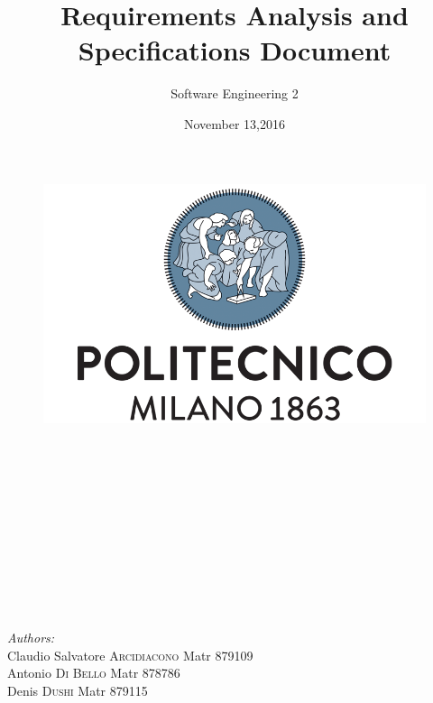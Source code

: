 \documentclass[a4paper]{article}
\title{Requirements Analysis and Specifications Document}
\author{Software Engineering 2}
\date{November 13,2016}
\begin{document}
\maketitle

\begin{figure}[h]
  \centering
  \includegraphics[width=300 pt]{resources/polimi.png}
  \label{fig:polimi}
\end{figure}

\emph{\\}
\emph{\\}
\emph{\\}
\emph{\\}
\emph{\\}
\emph{\\}
\emph{\\}
\emph{\\}
\emph{\\}
\emph{\\}

\begin{minipage}{0.7\textwidth}
\begin{flushleft} \large
\emph{Authors:}\\
Claudio Salvatore \textsc{Arcidiacono} Matr 879109\\
Antonio \emph{ }\emph{ }\emph{ }\emph{ }\emph{ }\emph{ }\emph{ }\emph{ }\emph{ }\emph{ }\emph{ }\emph{ }\textsc{Di Bello} \emph{ }\emph{ }\emph{ }\emph{ } Matr 878786\\
Denis  \emph{ }\emph{ }\emph{ }\emph{ }\emph{ }\emph{ }\emph{ }\emph{ }\emph{ }\emph{ }\emph{ }\emph{ }\emph{ }\emph{ }\emph{ }\textsc{Dushi } \emph{ }\emph{ }\emph{ }\emph{ }\emph{ }\emph{ }\emph{ }\emph{ }\emph{ }Matr 879115
\end{flushleft}
\end{minipage}

\begin{minipage}{0.4\textwidth}

\end{minipage}
\end{document}
